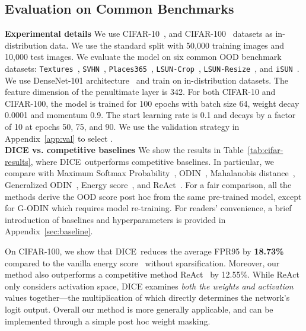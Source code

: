 \documentclass[runningheads]{llncs}
\newcommand{\methodAbbr}{DICE~}
\begin{document}
\subsection{Evaluation on Common Benchmarks}
\label{sec:common_benchmark}

\noindent \textbf{Experimental details}
We use  CIFAR-10~\cite{krizhevsky2009learning}, and CIFAR-100~\cite{krizhevsky2009learning} datasets as in-distribution data. We use the standard split with 50,000 training images and 10,000 test images. We evaluate the model on six common OOD benchmark datasets: \texttt{Textures}~\cite{cimpoi2014describing}, \texttt{SVHN}~\cite{netzer2011reading}, \texttt{Places365}~\cite{zhou2017places}, \texttt{LSUN-Crop}~\cite{yu2015lsun}, \texttt{LSUN-Resize}~\cite{yu2015lsun}, and \texttt{iSUN}~\cite{xu2015turkergaze}. We use DenseNet-101 architecture~\cite{huang2017densely} and train on in-distribution datasets. The feature dimension of the penultimate layer is 342. For both CIFAR-10 and CIFAR-100, the model is trained for 100 epochs with batch size 64, weight
decay 0.0001 and momentum 0.9. The start learning rate is 0.1 and decays by a factor of 10 at epochs 50, 75, and 90. We use the validation strategy in Appendix~\ref{app:val} to select . \\


\noindent \textbf{DICE vs. competitive baselines} We show the results in Table~\ref{tab:cifar-results}, where \methodAbbr outperforms competitive baselines. In particular, we compare with Maximum Softmax Probability~\cite{Kevin}, ODIN~\cite{liang2018enhancing}, Mahalanobis distance~\cite{lee2018simple}, Generalized ODIN~\cite{godin2020CVPR}, Energy score~\cite{liu2020energy}, and ReAct~\cite{sun2021react}. For a fair comparison, all the methods derive the OOD score post hoc from the same pre-trained model, except for G-ODIN which requires model re-training. {For readers' convenience, a brief introduction of baselines and hyperparameters is provided in Appendix~\ref{sec:baseline}.} 

On CIFAR-100, we show that \methodAbbr reduces the average FPR95 by \textbf{18.73\%} compared to the vanilla energy score~\cite{liu2020energy} without sparsification. Moreover, our method also outperforms a competitive method ReAct~\cite{sun2021react} by {12.55\%}. While {ReAct} only considers activation space, {DICE} examines \emph{both the {weights} and activation} values together---the multiplication of which {directly} determines the network's logit output. 
{Overall our method is more generally applicable}, and can be implemented through a simple {post hoc} weight masking. \\
\end{document}
